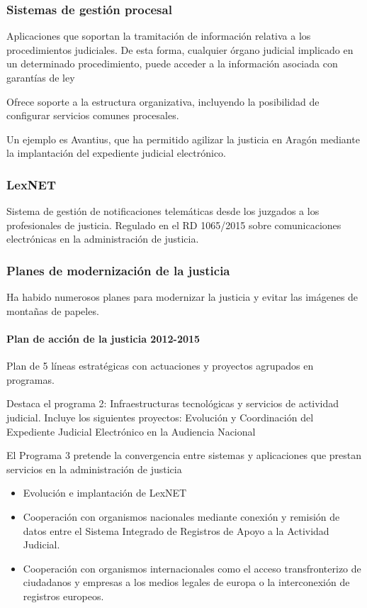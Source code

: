     \subsubsection{Sistemas de gestión procesal} %
        Aplicaciones que soportan la tramitación de información relativa a los procedimientos judiciales. De esta forma, cualquier órgano judicial implicado en un determinado procedimiento, puede acceder a la información asociada con garantías de ley

        Ofrece soporte a la estructura organizativa, incluyendo la posibilidad de configurar servicios comunes procesales.

        Un ejemplo es Avantius, que ha permitido agilizar la justicia en Aragón mediante la implantación del expediente judicial electrónico.

    \subsubsection{LexNET} %
        Sistema de gestión de notificaciones telemáticas desde los juzgados a los profesionales de justicia. Regulado en el RD 1065/2015 sobre comunicaciones electrónicas en la administración de justicia.

    \subsubsection{Planes de modernización de la justicia} %
        Ha habido numerosos planes para modernizar la justicia y evitar las imágenes de montañas de papeles.

        \paragraph{Plan de acción de la justicia 2012-2015} %
            Plan de 5 líneas estratégicas con actuaciones y proyectos agrupados en programas.
            
            Destaca el programa 2: Infraestructuras tecnológicas y servicios de actividad judicial. Incluye los siguientes proyectos: Evolución y Coordinación del Expediente Judicial Electrónico en la Audiencia Nacional

            El Programa 3 pretende la convergencia entre sistemas y aplicaciones que prestan servicios en la administración de justicia
            \begin{itemize}
                \item Evolución e implantación de LexNET
                \item Cooperación con organismos nacionales mediante conexión y remisión de datos entre el Sistema Integrado de Registros de Apoyo a la Actividad Judicial.
                \item Cooperación con organismos internacionales como el acceso transfronterizo de ciudadanos y empresas a los medios legales de europa o la interconexión de registros europeos.
            \end{itemize}

